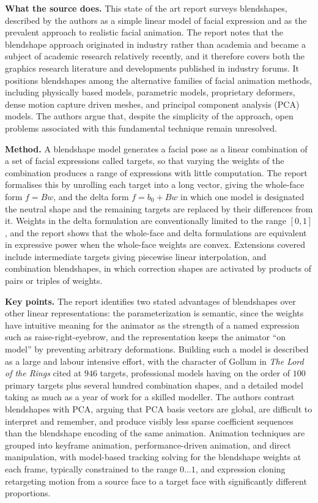 \documentclass[11pt, a4paper]{article}
\begin{document}
\textbf{What the source does.} This state of the art report surveys blendshapes, described by the authors as a simple linear model of facial expression and as the prevalent approach to realistic facial animation. The report notes that the blendshape approach originated in industry rather than academia and became a subject of academic research relatively recently, and it therefore covers both the graphics research literature and developments published in industry forums. It positions blendshapes among the alternative families of facial animation methods, including physically based models, parametric models, proprietary deformers, dense motion capture driven meshes, and principal component analysis (PCA) models. The authors argue that, despite the simplicity of the approach, open problems associated with this fundamental technique remain unresolved.

\textbf{Method.} A blendshape model generates a facial pose as a linear combination of a set of facial expressions called targets, so that varying the weights of the combination produces a range of expressions with little computation. The report formalises this by unrolling each target into a long vector, giving the whole-face form $f = Bw$, and the delta form $f = b_0 + Bw$ in which one model is designated the neutral shape and the remaining targets are replaced by their differences from it. Weights in the delta formulation are conventionally limited to the range $[0,1]$, and the report shows that the whole-face and delta formulations are equivalent in expressive power when the whole-face weights are convex. Extensions covered include intermediate targets giving piecewise linear interpolation, and combination blendshapes, in which correction shapes are activated by products of pairs or triples of weights.

\textbf{Key points.} The report identifies two stated advantages of blendshapes over other linear representations: the parameterization is semantic, since the weights have intuitive meaning for the animator as the strength of a named expression such as raise-right-eyebrow, and the representation keeps the animator ``on model'' by preventing arbitrary deformations. Building such a model is described as a large and labour intensive effort, with the character of Gollum in \emph{The Lord of the Rings} cited at $946$ targets, professional models having on the order of $100$ primary targets plus several hundred combination shapes, and a detailed model taking as much as a year of work for a skilled modeller. The authors contrast blendshapes with PCA, arguing that PCA basis vectors are global, are difficult to interpret and remember, and produce visibly less sparse coefficient sequences than the blendshape encoding of the same animation. Animation techniques are grouped into keyframe animation, performance-driven animation, and direct manipulation, with model-based tracking solving for the blendshape weights at each frame, typically constrained to the range $0 \dots 1$, and expression cloning retargeting motion from a source face to a target face with significantly different proportions.
\end{document}
